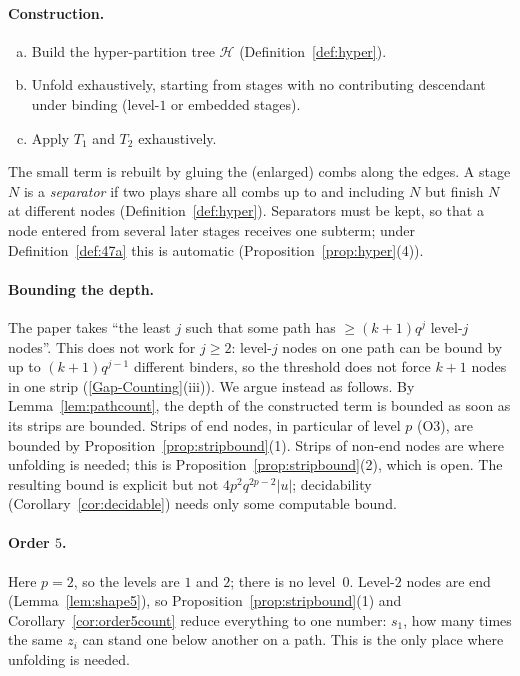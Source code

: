 \documentclass[11pt]{article}
\theoremstyle{plain}
\theoremstyle{definition}
\theoremstyle{remark}
\newcommand{\GapCounting}{\hyperref[gap:count]{[Gap-Counting]}}
\begin{document}
\paragraph{Construction.}
\begin{enumerate}[(a)]
\item Build the hyper-partition tree $\mathcal H$
  (Definition~\ref{def:hyper}).
\item Unfold exhaustively, starting from stages with no contributing
  descendant under binding (level-$1$ or embedded stages).
\item Apply $T_1$ and $T_2$ exhaustively.
\end{enumerate}
The small term is rebuilt by gluing the (enlarged) combs along the
edges.  A stage $N$ is a \emph{separator} if two plays share all combs up
to and including $N$ but finish $N$ at different nodes
(Definition~\ref{def:hyper}).  Separators must be kept, so that a node
entered from several later stages receives one subterm; under
Definition~\ref{def:47a} this is automatic
(Proposition~\ref{prop:hyper}(4)).

\paragraph{Bounding the depth.}
The paper takes ``the least $j$ such that some path has $\ge(k+1)q^j$
level-$j$ nodes''.  This does not work for $j\ge2$: level-$j$ nodes on
one path can be bound by up to $(k+1)q^{j-1}$ different binders, so the
threshold does not force $k+1$ nodes in one strip
(\GapCounting{}(iii)).  We argue instead as follows.  By
Lemma~\ref{lem:pathcount}, the depth of the constructed term is bounded
as soon as its strips are bounded.  Strips of end nodes, in particular
of level $p$ (O3), are bounded by Proposition~\ref{prop:stripbound}(1).
Strips of non-end nodes are where unfolding is needed; this is
Proposition~\ref{prop:stripbound}(2), which is open.  The resulting
bound is explicit but not $4p^2q^{2p-2}|u|$; decidability
(Corollary~\ref{cor:decidable}) needs only some computable bound.

\paragraph{Order $5$.}
Here $p=2$, so the levels are $1$ and $2$; there is no level~$0$.
Level-$2$ nodes are end (Lemma~\ref{lem:shape5}), so
Proposition~\ref{prop:stripbound}(1) and Corollary~\ref{cor:order5count}
reduce everything to one number: $s_1$, how many times the same $z_i$
can stand one below another on a path.  This is the only place where
unfolding is needed.
\end{document}
